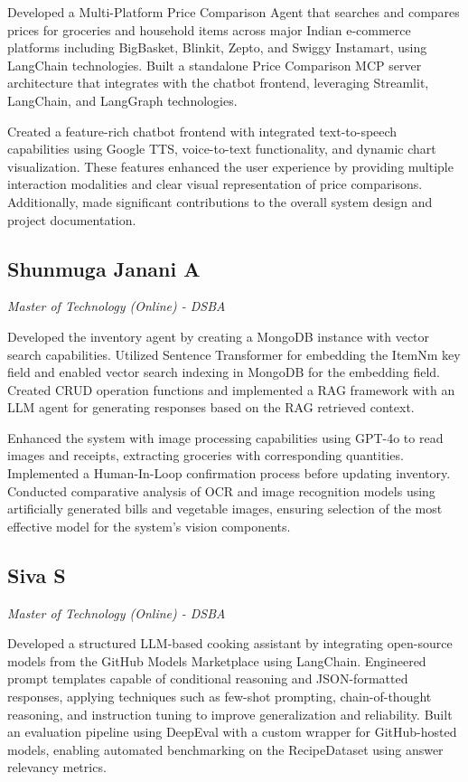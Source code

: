\documentclass{ecai}
\begin{document}
Developed a Multi-Platform Price Comparison Agent that searches and compares prices for groceries and household items across major Indian e-commerce platforms including BigBasket, Blinkit, Zepto, and Swiggy Instamart, using LangChain technologies. Built a standalone Price Comparison MCP server architecture that integrates with the chatbot frontend, leveraging Streamlit, LangChain, and LangGraph technologies.

Created a feature-rich chatbot frontend with integrated text-to-speech capabilities using Google TTS, voice-to-text functionality, and dynamic chart visualization. These features enhanced the user experience by providing multiple interaction modalities and clear visual representation of price comparisons. Additionally, made significant contributions to the overall system design and project documentation.

\subsection*{Shunmuga Janani A}
\textit{Master of Technology (Online) - DSBA}

Developed the inventory agent by creating a MongoDB instance with vector search capabilities. Utilized Sentence Transformer for embedding the ItemNm key field and enabled vector search indexing in MongoDB for the embedding field. Created CRUD operation functions and implemented a RAG framework with an LLM agent for generating responses based on the RAG retrieved context.

Enhanced the system with image processing capabilities using GPT-4o to read images and receipts, extracting groceries with corresponding quantities. Implemented a Human-In-Loop confirmation process before updating inventory. Conducted comparative analysis of OCR and image recognition models using artificially generated bills and vegetable images, ensuring selection of the most effective model for the system's vision components.

\subsection*{Siva S}
\textit{Master of Technology (Online) - DSBA}

Developed a structured LLM-based cooking assistant by integrating open-source models from the GitHub Models Marketplace using LangChain. Engineered prompt templates capable of conditional reasoning and JSON-formatted responses, applying techniques such as few-shot prompting, chain-of-thought reasoning, and instruction tuning to improve generalization and reliability. Built an evaluation pipeline using DeepEval with a custom wrapper for GitHub-hosted models, enabling automated benchmarking on the RecipeDataset using answer relevancy metrics.
\end{document}
